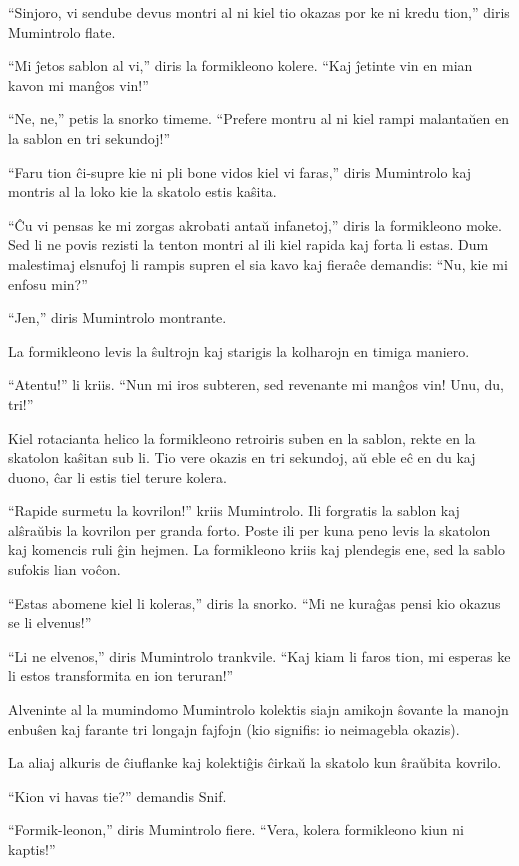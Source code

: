 ``Sinjoro, vi sendube devus montri al ni kiel tio okazas por ke ni kredu tion,'' diris Mumintrolo flate.

``Mi ĵetos sablon al vi,'' diris la formikleono kolere. ``Kaj ĵetinte vin en mian kavon mi manĝos vin!''

``Ne, ne,'' petis la snorko timeme. ``Prefere montru al ni kiel rampi malantaŭen en la sablon en tri sekundoj!''

``Faru tion ĉi-supre kie ni pli bone vidos kiel vi faras,'' diris Mumintrolo kaj montris al la loko kie la skatolo estis kaŝita.

``Ĉu vi pensas ke mi zorgas akrobati antaŭ infanetoj,'' diris la formikleono moke. Sed li ne povis rezisti la tenton montri al ili kiel rapida kaj forta li estas. Dum malestimaj elsnufoj li rampis supren el sia kavo kaj fieraĉe demandis: ``Nu, kie mi enfosu min?''

``Jen,'' diris Mumintrolo montrante.

La formikleono levis la ŝultrojn kaj starigis la kolharojn en timiga maniero.

``Atentu!'' li kriis. ``Nun mi iros subteren, sed revenante mi manĝos vin! Unu, du, tri!''

Kiel rotacianta helico la formikleono retroiris suben en la sablon, rekte en la skatolon kaŝitan sub li. Tio vere okazis en tri sekundoj, aŭ eble eĉ en du kaj duono, ĉar li estis tiel terure kolera.

``Rapide surmetu la kovrilon!'' kriis Mumintrolo. Ili forgratis la sablon kaj alŝraŭbis la kovrilon per granda forto. Poste ili per kuna peno levis la skatolon kaj komencis ruli ĝin hejmen. La formikleono kriis kaj plendegis ene, sed la sablo sufokis lian voĉon.

``Estas abomene kiel li koleras,'' diris la snorko. ``Mi ne kuraĝas pensi kio okazus se li elvenus!''

``Li ne elvenos,'' diris Mumintrolo trankvile. ``Kaj kiam li faros tion, mi esperas ke li estos transformita en ion teruran!''

Alveninte al la mumindomo Mumintrolo kolektis siajn amikojn ŝovante la manojn enbuŝen kaj farante tri longajn fajfojn (kio signifis: io neimagebla okazis).

La aliaj alkuris de ĉiuflanke kaj kolektiĝis ĉirkaŭ la skatolo kun ŝraŭbita kovrilo.

``Kion vi havas tie?'' demandis Snif.

``Formik-leonon,'' diris Mumintrolo fiere. ``Vera, kolera formikleono kiun ni kaptis!''


